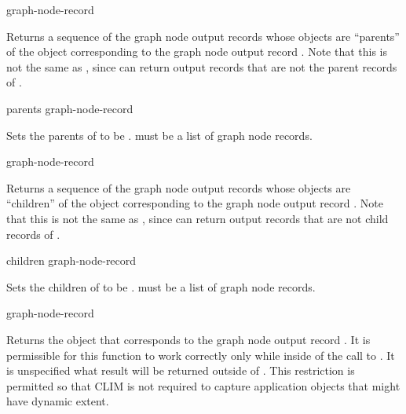  {graph-node-record}

Returns a sequence of the graph node output records whose objects are
``parents'' of the object corresponding to the graph node output record
.  Note that this is not the same as
, since  can return output
records that are not the parent records of .

 {parents graph-node-record}

Sets the parents of  to be .  
must be a list of graph node records.

 {graph-node-record}

Returns a sequence of the graph node output records whose objects are
``children'' of the object corresponding to the graph node output record
.  Note that this is not the same as
, since  can return output
records that are not child records of .

 {children graph-node-record}

Sets the children of  to be .
 must be a list of graph node records.

 {graph-node-record}

Returns the object that corresponds to the graph node output record
.  It is permissible for this function to work correctly
only while inside of the call to .  It is unspecified
what result will be returned outside of .  This
restriction is permitted so that CLIM is not required to capture application
objects that might have dynamic extent.
